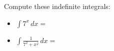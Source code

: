 Compute these indefinite integrals:
\medskip
\begin{itemize}
\item $\displaystyle \int 7^x \,dx =$
\vspace{1.8in}

\item $\displaystyle \int \frac{1}{7^2 + x^2} \,dx =$
\end{itemize}